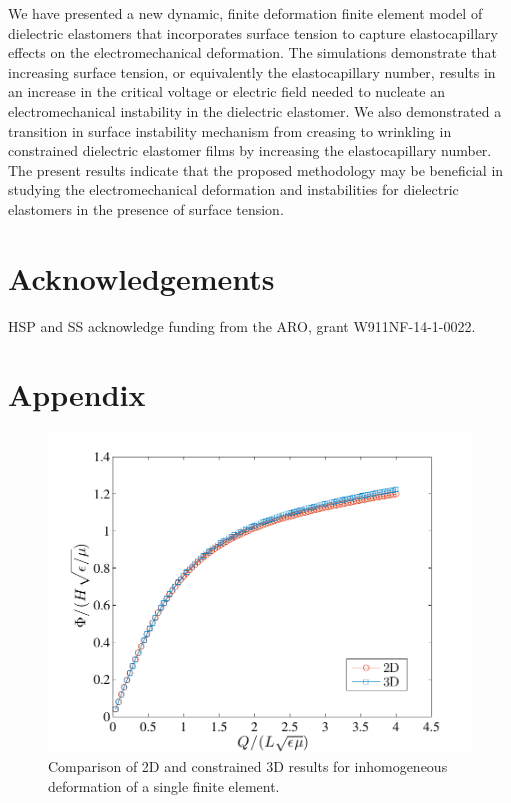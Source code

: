 \documentclass[8.5pt,twoside,twocolumn]{article}
\begin{document}
We have presented a new dynamic, finite deformation finite element model of dielectric elastomers that incorporates surface tension to capture elastocapillary effects on the electromechanical deformation.  The simulations demonstrate that increasing surface tension, or equivalently the elastocapillary number, results in an increase in the critical voltage or electric field needed to nucleate an electromechanical instability in the dielectric elastomer.  We also demonstrated a transition in surface instability mechanism from creasing to wrinkling in constrained dielectric elastomer films by increasing the elastocapillary number.  The present results indicate that the proposed methodology may be beneficial in studying the electromechanical deformation and instabilities for dielectric elastomers in the presence of surface tension.

\section{Acknowledgements}

HSP and SS acknowledge funding from the ARO, grant W911NF-14-1-0022.

\section{Appendix}

\begin{figure} \begin{center} 
\includegraphics[scale=0.58]{pics/2d3d.pdf}
\caption{Comparison of 2D and constrained 3D results for inhomogeneous deformation of a single finite element.}
\label{2d3d} \end{center} \end{figure}
\end{document}
